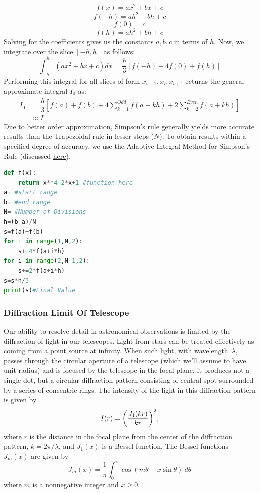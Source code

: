 \[	f(x)=ax^{2}+bx+c\]
\[	f(-h)=ah^{2}-bh+c\]
\[	f(0)=c\]
\[	f(h)=ah^{2}+bh+c\]
Solving for the coefficients gives us the constants $a,b,c$ in terms of $h$. Now, we integrate over the slice $[-h,h]$ as follows:
\[\int_{-h}^{h}(ax^{2}+bx+c)dx=\dfrac{h}{3}[f(-h)+4f(0)+f(h)]  \]
Performing this integral for all slices of form $x_{i-1},x_{i},x_{i+1}$ returns the general approximate integral $I_{0}$ as:
\[\begin{split}
I_{0}&=\dfrac{h}{3}[f(a)+f(b)+4\sum_{k=1}^{Odd}f(a+kh)+2\sum_{k=2}^{Even}f(a+kh)]\\
&\approx I
\end{split}\]
Due to better order approximation, Simpson's rule generally yields more accurate results than the Trapezoidal rule in lesser steps ($N$). To obtain results within a specified degree of accuracy, we use the Adaptive Integral Method for Simpson's Rule (discussed \hyperref[subsec:3.4]{here}).
\begin{lstlisting}[language=Python, caption=Simpson's Rule, frame=single, label={lst:L4} ]
def f(x):
	return x**4-2*x+1 #function here
a= #start range
b= #end range
N= #Number of Divisions
h=(b-a)/N
s=f(a)+f(b)
for i in range(1,N,2):
	s+=4*f(a+i*h)
for i in range(2,N-1,2):
	s+=2*f(a+i*h)
s=s*h/3 
print(s)#Final Value
\end{lstlisting}
\subsubsection{Diffraction Limit Of Telescope}
Our ability to resolve detail in astronomical observations is
limited by the diffraction of light in our telescopes.  Light from stars
can be treated effectively as coming from a point source at infinity.  When
such light, with wavelength~$\lambda$, passes through the circular aperture
of a telescope (which we'll assume to have unit radius) and is focused by
the telescope in the focal plane, it produces not a single dot, but a
circular diffraction pattern consisting of central spot surrounded by a
series of concentric rings.  The intensity of the light in this diffraction
pattern is given by
\begin{displaymath}
I(r) = \biggl( {J_1(kr)\over kr} \biggr)^2,
\end{displaymath}
where $r$ is the distance in the focal plane from the center of the
diffraction pattern, $k=2\pi/\lambda$, and $J_1(x)$ is a Bessel function.
The Bessel functions~$J_m(x)$ are given by
\begin{displaymath}
J_m(x) = {\dfrac{1}{\pi}} \int_0^\pi \cos(m\theta - x\sin\theta) \ d\theta
\end{displaymath}
where $m$ is a nonnegative integer and $x\ge0$. \\

